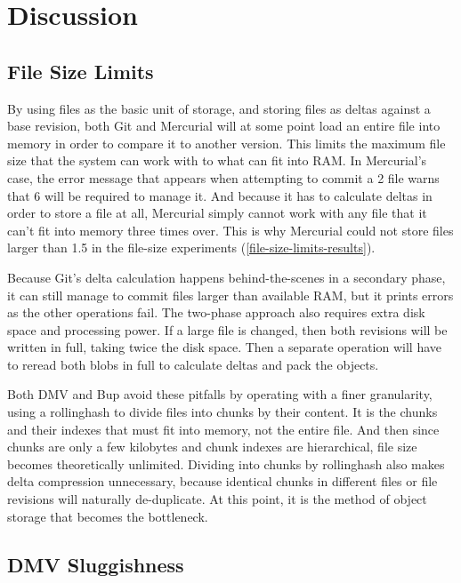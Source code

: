 \section{Discussion}

\subsection{File Size Limits}


By using files as the basic unit of storage, and storing files as deltas against
a base revision, both Git and Mercurial will at some point load an entire file
into memory in order to compare it to another version. This limits the maximum
file size that the system can work with to what can fit into RAM. In Mercurial's
case, the error message that appears when attempting to \gls{commit} a
\SI{2}{\gib} file warns that \SI{6}{\gib} will be required to manage it. And
because it has to calculate deltas in order to store a file at all, Mercurial
simply cannot work with any file that it can't fit into memory three times over.
This is why Mercurial could not store files larger than \SI{1.5}{\gib} in the
file-size experiments (\autoref{file-size-limits-results}).

Because Git's delta calculation happens behind-the-scenes in a secondary phase,
it can still manage to \gls{commit} files larger than available RAM, but it
prints errors as the other operations fail. The two-phase approach also requires
extra disk space and processing power. If a large file is changed, then both
revisions will be written in full, taking twice the disk space. Then a separate
operation will have to reread both \glspl{blob} in full to calculate deltas and
pack the objects.

Both \gls{DMV} and Bup avoid these pitfalls by operating with a finer
granularity, using a \gls{rollinghash} to divide files into chunks by their
content. It is the chunks and their indexes that must fit into memory, not the
entire file. And then since chunks are only a few kilobytes and chunk indexes
are hierarchical, file size becomes theoretically unlimited. Dividing into
chunks by \gls{rollinghash} also makes delta compression unnecessary, because
identical chunks in different files or file revisions will naturally
de-duplicate. At this point, it is the method of object storage that becomes the
bottleneck.

\subsection{DMV Sluggishness}

